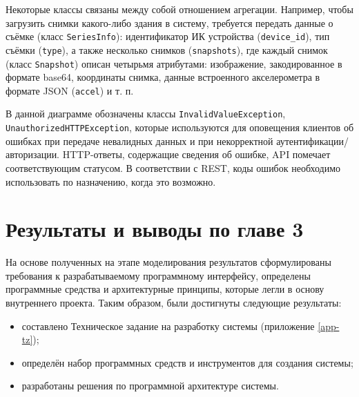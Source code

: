 	Некоторые классы связаны между собой отношением агрегации. Например, чтобы загрузить снимки какого-либо здания в систему, требуется передать данные о съёмке (класс \texttt{SeriesInfo}): идентификатор ИК устройства (\texttt{device\_id}), тип съёмки (\texttt{type}), а также несколько снимков (\texttt{snapshots}), где каждый снимок (класс \texttt{Snapshot}) описан четырьмя атрибутами: изображение, закодированное в формате base64, координаты снимка, данные встроенного акселерометра в формате JSON (\texttt{accel}) и т. п.

	В данной диаграмме обозначены классы \texttt{InvalidValueException}, \texttt{UnauthorizedHTTPException}, которые используются для оповещения клиентов об ошибках при передаче невалидных данных и при некорректной аутентификации/авторизации. HTTP-ответы, содержащие сведения об ошибке, API помечает соответствующим статусом. В соответствии с REST, коды ошибок необходимо использовать по назначению, когда это возможно.

	\pagebreak

\section{Результаты и выводы по главе 3}

\par
	
	На основе полученных на этапе моделирования результатов сформулированы требования к разрабатываемому программному интерфейсу, определены программные средства и архитектурные принципы, которые легли в основу внутреннего проекта. Таким образом, были достигнуты следующие результаты:

	\begin{itemize}
		\item составлено Техническое задание на разработку системы (приложение \ref{app-tz});
		\item определён набор программных средств и инструментов для создания системы;
		\item разработаны решения по программной архитектуре системы.
	\end{itemize}
